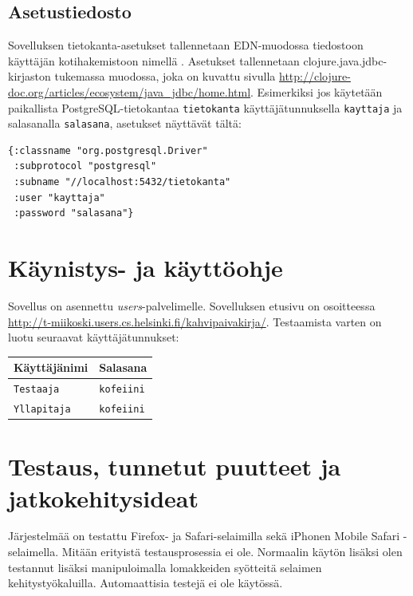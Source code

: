 \documentclass[a4paper,titlepage]{article}
\begin{document}
\subsection{Asetustiedosto}
\label{sec:asetustiedosto}

Sovelluksen tietokanta-asetukset tallennetaan EDN-muodossa tiedostoon
käyttäjän kotihakemistoon nimellä
. Asetukset tallennetaan
clojure.java.jdbc-kirjaston tukemassa muodossa, joka on kuvattu
sivulla
\url{http://clojure-doc.org/articles/ecosystem/java_jdbc/home.html}. Esimerkiksi
jos käytetään paikallista PostgreSQL-tietokantaa \texttt{tietokanta}
käyttäjätunnuksella \texttt{kayttaja} ja salasanalla
\texttt{salasana}, asetukset näyttävät tältä:

\begin{lstlisting}[basicstyle=\ttfamily]
{:classname "org.postgresql.Driver"
 :subprotocol "postgresql"
 :subname "//localhost:5432/tietokanta"
 :user "kayttaja"
 :password "salasana"}
\end{lstlisting}

\section{Käynistys- ja käyttöohje}

Sovellus on asennettu \emph{users}-palvelimelle. Sovelluksen etusivu on osoitteessa \url{http://t-miikoski.users.cs.helsinki.fi/kahvipaivakirja/}. Testaamista varten on luotu seuraavat käyttäjätunnukset:

\begin{center}
\begin{tabularx}{\textwidth}{|X|X|}
\hline
Käyttäjänimi & Salasana \\
\hline
\texttt{Testaaja} & \texttt{kofeiini} \\
\texttt{Yllapitaja} & \texttt{kofeiini} \\
\hline
\end{tabularx}
\end{center}


\section{Testaus, tunnetut puutteet ja jatkokehitysideat}

Järjestelmää on testattu Firefox- ja Safari-selaimilla sekä iPhonen
Mobile Safari -selaimella. Mitään erityistä testausprosessia ei
ole. Normaalin käytön lisäksi olen testannut lisäksi manipuloimalla
lomakkeiden syötteitä selaimen kehitystyökaluilla. Automaattisia
testejä ei ole käytössä.
\end{document}
